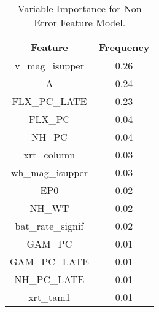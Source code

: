 \begin{table}[H]
\begin{center}
\begin{tabular}{cc}
  \hline
Feature & Frequency \\ 
  \hline
v\_mag\_isupper & 0.26 \\ 
  A & 0.24 \\ 
  FLX\_PC\_LATE & 0.23 \\ 
  FLX\_PC & 0.04 \\ 
  NH\_PC & 0.04 \\ 
  xrt\_column & 0.03 \\ 
  wh\_mag\_isupper & 0.03 \\ 
  EP0 & 0.02 \\ 
  NH\_WT & 0.02 \\ 
  bat\_rate\_signif & 0.02 \\ 
  GAM\_PC & 0.01 \\ 
  GAM\_PC\_LATE & 0.01 \\ 
  NH\_PC\_LATE & 0.01 \\ 
  xrt\_tam1 & 0.01 \\ 
   \hline
\end{tabular}
\caption{Variable Importance for Non Error Feature Model.}
\label{tab:nonErrorVarImp}
\end{center}
\end{table}
